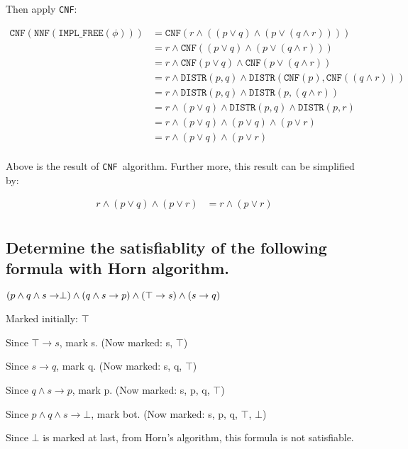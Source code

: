 \documentclass{ctexart}
\def\d{\vee}
\def\c{\wedge}
\def\NNF{\texttt{NNF}}
\def\IMPLFREE{\texttt{IMPL\_FREE}}
\def\CNF{\texttt{CNF}}
\def\DISTR{\texttt{DISTR}}
\begin{document}
\newpage

Then apply \CNF:

$$
\begin{aligned}
    \CNF(\NNF(\IMPLFREE(\phi))) &= \CNF(r \c ((p \d q) \c (p \d (q \c r)))) \\
    &= r \c \CNF((p \d q) \c (p \d (q \c r)))\\
    &= r \c \CNF(p \d q) \c \CNF(p \d (q \c r))\\
    &= r \c \DISTR(p, q) \c \DISTR(\CNF(p), \CNF((q \c r))) \\
    &= r \c \DISTR(p, q) \c \DISTR(p, (q \c r)) \\
    &= r \c (p \d q) \c \DISTR(p, q) \c \DISTR(p, r)\\
    &= r \c (p \d q) \c (p \d q) \c (p \d r)\\
    &= r \c (p \d q) \c (p \d r) \\
\end{aligned}
$$

Above is the result of \CNF \ algorithm. Further more, this result can be simplified by:

$$
\begin{aligned}
    r \c (p \d q) \c (p \d r) &=  r \c (p \d r) \\
\end{aligned}
$$

\subsection{Determine the satisfiablity of the following formula with Horn algorithm.}

$
(p \wedge q \wedge s \rightarrow \perp) \wedge(q \wedge s \rightarrow p) \wedge(\top \rightarrow s) \wedge(s \rightarrow q)\\
$

Marked initially: $\top$

Since $\top \to s$, mark s. (Now marked: s, $\top$)

Since $s \to q$, mark q. (Now marked: s, q, $\top$)

Since $q \c s \to p$, mark p. (Now marked: s, p, q, $\top$)

Since $p \c q \c s \to \bot$, mark bot. (Now marked: s, p, q, $\top$, $\bot$)

Since $\bot$ is marked at last, from Horn's algorithm, this formula is not satisfiable.
\end{document}
